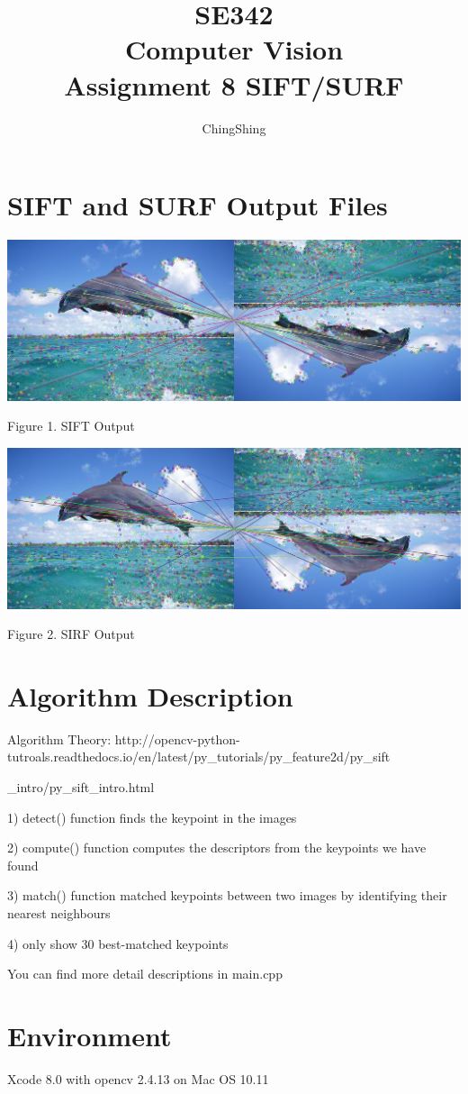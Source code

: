\documentclass[psamsfonts]{amsart}
\title{SE342 \\
Computer Vision\\
Assignment 8 SIFT/SURF}
\author{ChingShing}
\begin{document}
\maketitle

\section{SIFT and SURF Output Files}

\graphicspath{{/Users/ching_shing/Documents/0Junior/Vision/SE342 Computer\ Vision/8\ SIFT/SIFT/}}

\includegraphics[width=6in]{sift.jpg}

Figure 1. SIFT Output

\includegraphics[width=6in]{surf.jpg}

Figure 2. SIRF Output

\section{Algorithm Description}

Algorithm Theory: 
http://opencv-python-tutroals.readthedocs.io/en/latest/py\_tutorials/py\_feature2d/py\_sift

\_intro/py\_sift\_intro.html

1) detect() function finds the keypoint in the images

2) compute() function computes the descriptors from the keypoints we have found

3) match() function matched keypoints between two images by identifying their nearest neighbours

4) only show 30 best-matched keypoints

You can find more detail descriptions in main.cpp

\section{Environment}

Xcode 8.0 with opencv 2.4.13 on Mac OS 10.11
\end{document}
